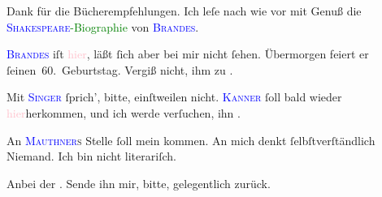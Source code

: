\pstart
           Dank für die Bücherempfehlungen. Ich leſe nach wie vor mit Genuß die \textcolor{green}{\textsc{\textcolor{blue}{Shakespeare}{}\ledrightnote{\textcolor{blue}{William Shakespeare}}}-Biographie}{}\ledrightnote{\textcolor{green}{William Shakespeare}} von \textsc{\textcolor{blue}{Brandes}{}\ledrightnote{\textcolor{blue}{Georg Brandes}}}.\pend
           
\pstart
           \textsc{\textcolor{blue}{Brandes}{}\ledrightnote{\textcolor{blue}{Georg Brandes}}} iſt \textcolor{pink}{hier}{}\ledrightnote{{$\rightarrow$}\textcolor{pink}{Berlin}}, läßt ſich aber
               bei mir nicht ſehen. Übermorgen feiert \introOben{}er\introOben{} ſeinen 60. Geburtstag. Vergiß nicht, ihm zu \label{K_L03196-11v}\label{K_L03196-11h}.\pend
           
\pstart
           {\pb}Mit \textsc{\textcolor{blue}{Singer}{}\ledrightnote{\textcolor{blue}{Isidor Singer}}} ſprich’, bitte, einſtweilen nicht. \textsc{\textcolor{blue}{Kanner}{}\ledrightnote{\textcolor{blue}{Heinrich Kanner}}} ſoll bald wieder \textcolor{pink}{hier}{}\ledrightnote{{$\rightarrow$}\textcolor{pink}{Berlin}}herkommen, und ich werde verſuchen, ihn \label{K_L03196-13v}\label{K_L03196-13h}.\pend
           
\pstart
           An \textsc{\textcolor{blue}{Mauthner}{}\ledrightnote{\textcolor{blue}{Fritz Mauthner}}s} Stelle ſoll mein \label{K_L03196-55v}\label{K_L03196-55h} kommen. An mich
               denkt ſelbſtverſtändlich Niemand. Ich bin nicht literariſch.\pend
           
\pstart
           Anbei der \label{K_L03196-67v}\label{K_L03196-67h}. Sende ihn mir, bitte, gelegentlich zurück.\pend
           
